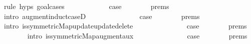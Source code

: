 \begin{isabellebody}
\ {\isacharparenleft}{\kern0pt}rule\ {\isachardoublequoteopen}{}{\isachardot}{\kern0pt}hyps{\isachardoublequoteclose}{\isacharcomma}{\kern0pt}\ goal{\isacharunderscore}{\kern0pt}cases{\isacharparenright}{\kern0pt}\isanewline
\ \ \ \ \isamarkupfalse%
\ {}\isanewline
\ \ \ \ \isamarkupfalse%
\ {\isacharquery}{\kern0pt}case\isanewline
\ \ \ \ \ \ \isamarkupfalse%
\ {\isachardoublequoteopen}{}{\isachardot}{\kern0pt}prems{\isachardoublequoteclose}\isanewline
\ \ \ \ \ \ \isamarkupfalse%
\ {\isacharparenleft}{\kern0pt}intro\ augment{\isacharunderscore}{\kern0pt}induct{\isacharunderscore}{\kern0pt}case{\isacharunderscore}{\kern0pt}{}D{\isacharparenleft}{\kern0pt}{}{}{\isacharparenright}{\kern0pt}{\isacharparenright}{\kern0pt}\isanewline
\ \ \isamarkupfalse%
\isanewline
\ \ \ \ \isamarkupfalse%
\ {}\isanewline
\ \ \ \ \isamarkupfalse%
\ {\isacharquery}{\kern0pt}case\isanewline
\ \ \ \ \ \ \isamarkupfalse%
\ {\isachardoublequoteopen}{}{\isachardot}{\kern0pt}prems{\isachardoublequoteclose}\isanewline
\ \ \ \ \ \ \isamarkupfalse%
\ {\isacharparenleft}{\kern0pt}intro\ is{\isacharunderscore}{\kern0pt}symmetric{\isacharunderscore}{\kern0pt}Map{\isacharunderscore}{\kern0pt}update{\isacharunderscore}{\kern0pt}update{\isacharunderscore}{\kern0pt}delete{\isacharparenright}{\kern0pt}\isanewline
\ \ \isamarkupfalse%
\isanewline
\ \ \ \ \isamarkupfalse%
\ {}\isanewline
\ \ \ \ \isamarkupfalse%
\ {\isacharquery}{\kern0pt}case\isanewline
\ \ \ \ \ \ \isamarkupfalse%
\ {\isachardoublequoteopen}{}{\isachardot}{\kern0pt}prems{\isachardoublequoteclose}\isanewline
\ \ \ \ \ \ \isamarkupfalse%
\ {\isacharparenleft}{\kern0pt}intro\ is{\isacharunderscore}{\kern0pt}symmetric{\isacharunderscore}{\kern0pt}Map{\isacharunderscore}{\kern0pt}augment{\isacharunderscore}{\kern0pt}aux{\isacharparenright}{\kern0pt}\isanewline
\ \ \isamarkupfalse%
\isanewline
\ \ \ \ \isamarkupfalse%
\ {}\isanewline
\ \ \ \ \isamarkupfalse%
\ {\isacharquery}{\kern0pt}case\isanewline
\ \ \ \ \ \ \isamarkupfalse%
\ {\isachardoublequoteopen}{}{\isachardot}{\kern0pt}prems{\isachardoublequoteclose}{\isacharparenleft}{\kern0pt}{}{\isacharparenright}{\kern0pt}\isanewline

\end{isabellebody}
